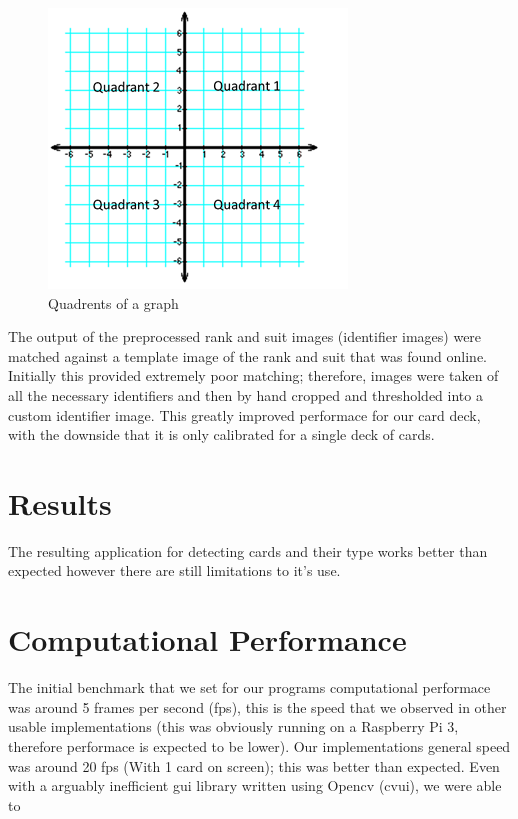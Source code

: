 \documentclass[conference]{IEEEtran}
\begin{document}
\begin{figure}[htbp]
\centerline{\includegraphics{graph-quadrants.png}}
\caption{Quadrents of a graph}
\label{fig:graph}
\end{figure}


The output of the preprocessed rank and suit images (identifier images) were matched against a
template image of the rank and suit that was found online. Initially this provided extremely poor
matching; therefore, images were taken of all the necessary identifiers and then by hand cropped and
thresholded into a custom identifier image. This greatly improved performace for our card deck, with
the downside that it is only calibrated for a single deck of cards.


\section{Results}
The resulting application for detecting cards and their type works better than expected however
there are still limitations to it's use.

\section{Computational Performance}
The initial benchmark that we set for our programs computational performace was around 5 frames per
second (fps), this is the speed that we observed in other usable implementations
\cite{opencv-card-detection} (this was obviously running on a Raspberry Pi 3, therefore performace
is expected to be lower). Our implementations general speed was around 20 fps (With 1 card on
screen); this was better than expected. Even with a arguably inefficient gui library written using
Opencv (cvui), we were able to 
\end{document}
